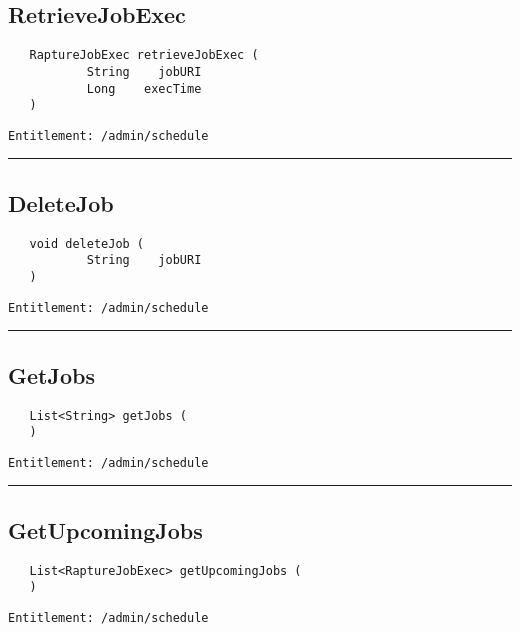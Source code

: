 \subsection{RetrieveJobExec}
\label{Api:RetrieveJobExec}
\begin{verbatim}
   RaptureJobExec retrieveJobExec (
           String    jobURI
           Long    execTime
   )
\end{verbatim}
\begin{Verbatim}[fontsize=\small, formatcom=\color{Maroon}]
  Entitlement: /admin/schedule
\end{Verbatim}



\rule{12cm}{2pt}
\subsection{DeleteJob}
\label{Api:DeleteJob}
\begin{verbatim}
   void deleteJob (
           String    jobURI
   )
\end{verbatim}
\begin{Verbatim}[fontsize=\small, formatcom=\color{Maroon}]
  Entitlement: /admin/schedule
\end{Verbatim}



\rule{12cm}{2pt}
\subsection{GetJobs}
\label{Api:GetJobs}
\begin{verbatim}
   List<String> getJobs (
   )
\end{verbatim}
\begin{Verbatim}[fontsize=\small, formatcom=\color{Maroon}]
  Entitlement: /admin/schedule
\end{Verbatim}



\rule{12cm}{2pt}
\subsection{GetUpcomingJobs}
\label{Api:GetUpcomingJobs}
\begin{verbatim}
   List<RaptureJobExec> getUpcomingJobs (
   )
\end{verbatim}
\begin{Verbatim}[fontsize=\small, formatcom=\color{Maroon}]
  Entitlement: /admin/schedule
\end{Verbatim}



